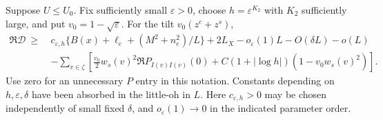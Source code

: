 \begin{proposition}\label{prop:07_magnetic_analysis-sharp}
Suppose \(U\le U_0\). Fix sufficiently small \(\varepsilon>0\), choose \(h=\varepsilon^{K_2}\) with \(K_2\) sufficiently large, and put \(v_0=1-\sqrt\varepsilon\). For the tilt \(v_0(z^c+z^s)\),
\begin{equation}
\begin{split}
 \Re\mathcal D \ \ge\ &
 c_{\varepsilon,h}\{B(x)+\ell_e+(M^2+n_e^2)/L\}
 +2L_X-o_\varepsilon(1)L-O(\delta L)-o(L)\\
 &-\sum_{v\in\zeta}
 \left[\frac{v_0}2 w_s(v)^2\Re P_{I(v)I(v)}(0)
      +C(1+|\log h|)(1-v_0 w_s(v)^2)\right].
\end{split}
 \label{eq:M-29}
\end{equation}
Use zero for an unnecessary \(P\) entry in this notation. Constants depending on \(h,\varepsilon,\delta\) have been absorbed in the little-oh in \(L\). Here \(c_{\varepsilon,h}>0\) may be chosen independently of small fixed \(\delta\), and \(o_\varepsilon(1)\to0\) in the indicated parameter order.


\end{proposition}
